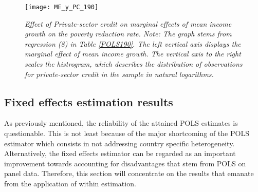 \documentclass[12pt, a4paper]{article}
\begin{document}
\begin{figure}[htbp]
	\texttt{[image: ME\_y\_PC\_190]}
	\centering
	\caption[Marginal Effect of Mean Income Growth on Poverty Reduction at Given Levels of Private-sector Credit to GDP]{\textit{Effect of Private-sector credit on marginal effects of mean income growth on the poverty reduction rate. Note: The graph stems from regression (8) in Table \ref{POLS190}. The left vertical axis displays the marginal effect of mean income growth. The vertical axis to the right scales the histrogram, which describes the distribution of observations for private-sector credit in the sample in natural logarithms.}}
	\label{fig4}
\end{figure}

\newpage
\subsection{Fixed effects estimation results}

As previously mentioned, the reliability of the attained POLS estimates is questionable. This is not least because of the major shortcoming of the POLS estimator which consists in not addressing country specific heterogeneity. Alternatively, the fixed effects estimator can be regarded as an important improvement towards accounting for disadvantages that stem from POLS on panel data. Therefore, this section will concentrate on the results that emanate from the application of within estimation.
\end{document}
